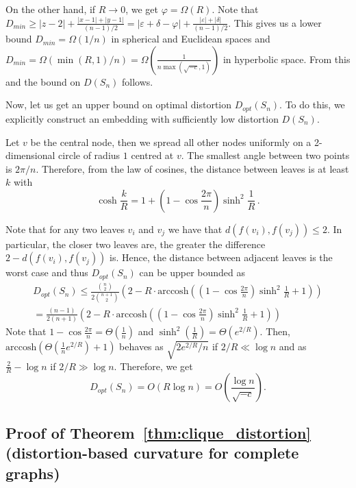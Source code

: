 \documentclass{article} %
\newcommand{\ph}[1]{\textcolor{blue}{#1}}
\begin{document}
On the other hand, if $R \to 0$, we get $\varphi = \Omega(R)$.
Note that $D_{min} \ge |z-2| + \frac{|x-1| + |y-1|}{(n-1)/2} =  |\varepsilon + \delta - \varphi| + \frac{|\varepsilon| + |\delta|}{(n-1)/2}$. This gives us a lower bound $D_{min} = \Omega(1/n)$ in spherical and Euclidean spaces and 
$D_{min} = \Omega(\min(R,1)/n) = \Omega\left(\frac{1}{n\max\left(\sqrt{-c},1\right)}\right)$ in hyperbolic space.
From this and  the bound on $D(S_n)$ follows.

Now, let us get an upper bound on optimal distortion $D_{opt}(S_n)$. To do this, we explicitly construct an embedding with sufficiently low distortion $D(S_n)$.

Let $v$ be the central node, then we spread all other nodes uniformly on a 2-dimensional circle of radius $1$ centred at $v$. The smallest angle between two points is $2 \pi / n$. Therefore, from the law of cosines, the distance between leaves is at least $k$ with
\[
\cosh \frac{k}{R} = 1  + \left(1 -  \cos \frac{2 \pi}{n}\right)  \sinh^2 \frac{1}{R} \,.
\]

Note that for any two leaves $v_i$ and $v_j$ we have that $d(f(v_i), f(v_j)) \le 2$. In particular, the closer two leaves are, the greater the difference $2 - d(f(v_i), f(v_j))$ is. Hence, the distance between adjacent leaves is the worst case and thus $D_{opt}(S_n)$ can be upper bounded as
\begin{multline*}
D_{opt}(S_n) \le \frac{{n \choose 2}}{2{n+1\choose 2}} \left(2 - R\cdot \mathrm{arccosh}\left( \left(1 - \cos \frac{2 \pi}{n}\right)\sinh^2\frac{1}{R}  + 1 \right)\right) \\
= \frac{(n-1)}{2(n+1)} \left(2 - R\cdot \mathrm{arccosh}\left( \left(1 - \cos \frac{2 \pi}{n}\right)\sinh^2\frac{1}{R}  + 1 \right)\right)
\end{multline*}
Note that $1 - \cos\frac{2\pi}{n} = \Theta\left(\frac{1}{n}\right)$ and $\sinh^2\left(\frac{1}{R}\right) = \Theta\left(e^{2/R}\right)$.
Then, $\textrm{arccosh}\left(\Theta\left(\frac{1}{n} e^{2/R}\right) + 1 \right)$ behaves as $\sqrt{2e^{2/R}/n}$ if $2/R \ll \log n$ and as $\frac{2}{R} - \log n$ if $2/R \gg \log n$.
Therefore, we get
\[
D_{opt}(S_n) = O\left( R \log n \right) = O\left( \frac{\log n}{\sqrt{-c}} \right).
\]

\subsection{Proof of Theorem~\ref{thm:clique_distortion} (distortion-based curvature for complete graphs)}\label{app:clique_distortion}
\end{document}
